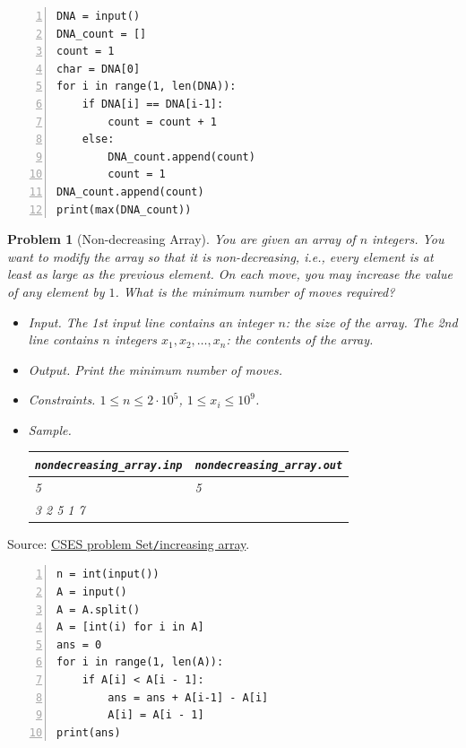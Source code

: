\documentclass{article}
\newtheorem{problem}{Problem}
\begin{document}
\begin{Verbatim}[numbers=left,xleftmargin=5mm]
DNA = input()
DNA_count = []
count = 1
char = DNA[0]
for i in range(1, len(DNA)):
    if DNA[i] == DNA[i-1]:
        count = count + 1
    else:
        DNA_count.append(count)
        count = 1
DNA_count.append(count)
print(max(DNA_count))
\end{Verbatim}

\begin{problem}[Non-decreasing Array]
	You are given an array of $n$ integers. You want to modify the array so that it is non-decreasing, i.e., every element is at least as large as the previous element. On each move, you may increase the value of any element by $1$. What is the minimum number of moves required?
	\begin{itemize}
		\item {\sf Input.} The 1st input line contains an integer $n$: the size of the array. The 2nd line contains $n$ integers $x_1,x_2,\ldots,x_n$: the contents of the array.
		\item {\sf Output.} Print the minimum number of moves.
		\item {\sf Constraints.} $1\le n\le2\cdot10^5$, $1\le x_i\le10^9$.
		\item {\sf Sample.}
		\begin{table}[H]
			\centering
			\begin{tabular}{|l|l|}
				\hline
				\verb|nondecreasing_array.inp| & \verb|nondecreasing_array.out| \\
				\hline
				5 & 5 \\
				3 2 5 1 7 & \\
				\hline
			\end{tabular}
		\end{table}
	\end{itemize}
\end{problem}
Source: \href{https://cses.fi/problemset/task/1094}{CSES problem Set\texttt{/}increasing array}.

\begin{Verbatim}[numbers=left,xleftmargin=5mm]
n = int(input())
A = input()
A = A.split()
A = [int(i) for i in A]
ans = 0
for i in range(1, len(A)):
    if A[i] < A[i - 1]:
        ans = ans + A[i-1] - A[i]
        A[i] = A[i - 1]
print(ans)
\end{Verbatim}
\end{document}
